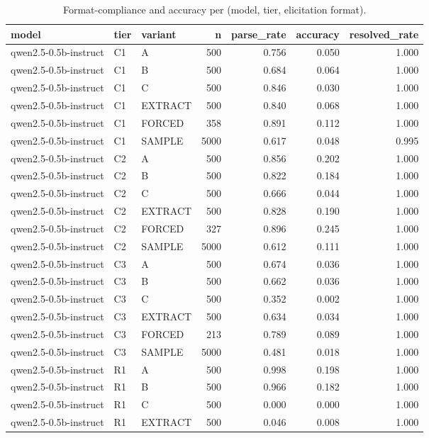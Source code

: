 \begin{table}
\caption{Format-compliance and accuracy per (model, tier, elicitation format).}
\label{tab:t3_parse_and_accuracy}
\begin{tabular}{lllrrrr}
\toprule
model & tier & variant & n & parse\_rate & accuracy & resolved\_rate \\
\midrule
qwen2.5-0.5b-instruct & C1 & A & 500 & 0.756 & 0.050 & 1.000 \\
qwen2.5-0.5b-instruct & C1 & B & 500 & 0.684 & 0.064 & 1.000 \\
qwen2.5-0.5b-instruct & C1 & C & 500 & 0.846 & 0.030 & 1.000 \\
qwen2.5-0.5b-instruct & C1 & EXTRACT & 500 & 0.840 & 0.068 & 1.000 \\
qwen2.5-0.5b-instruct & C1 & FORCED & 358 & 0.891 & 0.112 & 1.000 \\
qwen2.5-0.5b-instruct & C1 & SAMPLE & 5000 & 0.617 & 0.048 & 0.995 \\
qwen2.5-0.5b-instruct & C2 & A & 500 & 0.856 & 0.202 & 1.000 \\
qwen2.5-0.5b-instruct & C2 & B & 500 & 0.822 & 0.184 & 1.000 \\
qwen2.5-0.5b-instruct & C2 & C & 500 & 0.666 & 0.044 & 1.000 \\
qwen2.5-0.5b-instruct & C2 & EXTRACT & 500 & 0.828 & 0.190 & 1.000 \\
qwen2.5-0.5b-instruct & C2 & FORCED & 327 & 0.896 & 0.245 & 1.000 \\
qwen2.5-0.5b-instruct & C2 & SAMPLE & 5000 & 0.612 & 0.111 & 1.000 \\
qwen2.5-0.5b-instruct & C3 & A & 500 & 0.674 & 0.036 & 1.000 \\
qwen2.5-0.5b-instruct & C3 & B & 500 & 0.662 & 0.036 & 1.000 \\
qwen2.5-0.5b-instruct & C3 & C & 500 & 0.352 & 0.002 & 1.000 \\
qwen2.5-0.5b-instruct & C3 & EXTRACT & 500 & 0.634 & 0.034 & 1.000 \\
qwen2.5-0.5b-instruct & C3 & FORCED & 213 & 0.789 & 0.089 & 1.000 \\
qwen2.5-0.5b-instruct & C3 & SAMPLE & 5000 & 0.481 & 0.018 & 1.000 \\
qwen2.5-0.5b-instruct & R1 & A & 500 & 0.998 & 0.198 & 1.000 \\
qwen2.5-0.5b-instruct & R1 & B & 500 & 0.966 & 0.182 & 1.000 \\
qwen2.5-0.5b-instruct & R1 & C & 500 & 0.000 & 0.000 & 1.000 \\
qwen2.5-0.5b-instruct & R1 & EXTRACT & 500 & 0.046 & 0.008 & 1.000 \\

\end{tabular}
\end{table}
